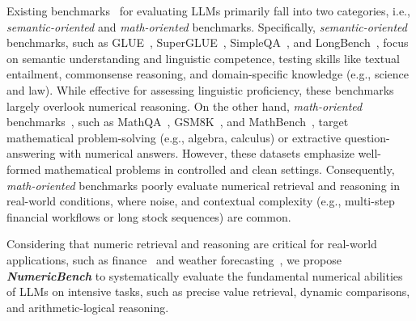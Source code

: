 Existing benchmarks~\cite{li2024survey,chang2024survey,zhao2023survey} for evaluating LLMs primarily fall into two categories, 
i.e., \textit{semantic-oriented} and \textit{math-oriented} benchmarks.
Specifically,
\textit{semantic-oriented} 
benchmarks, 
such as GLUE~\citep{wang2018glue},  
SuperGLUE~\citep{wang2019superglue}, 
SimpleQA~\citep{wei2024measuring}, 
and LongBench~\citep{bai2023longbench},
focus on semantic understanding and linguistic competence, 
testing skills like textual entailment, 
commonsense reasoning, and domain-specific knowledge (e.g., science and law). 
While effective for assessing linguistic proficiency, these benchmarks largely overlook numerical reasoning.
On the other hand,
\textit{math-oriented} benchmarks~\cite{gao2025gllava,li2024forewarned,cobbe2021training}, 
such as MathQA~\citep{amini2019mathqa}, 
GSM8K~\citep{cobbe2021training}, 
and MathBench~\citep{liu2024mathbench},
target mathematical problem-solving (e.g., algebra, calculus) or extractive question-answering with numerical answers. 
However, these datasets emphasize well-formed mathematical problems  in controlled and clean settings.
Consequently,
\textit{math-oriented} benchmarks poorly evaluate numerical retrieval and reasoning in real-world conditions, where noise, and contextual complexity (e.g., multi-step financial workflows or long stock sequences) are common.

Considering that numeric retrieval and reasoning are critical for real-world applications, 
such as finance~\citep{islam2023financebench} and weather forecasting~\cite{zhang2024self}, 
we propose \textbf{\textit{NumericBench}} to systematically evaluate the fundamental numerical abilities of  LLMs on intensive tasks, such as precise value retrieval, dynamic comparisons, and arithmetic-logical reasoning.








